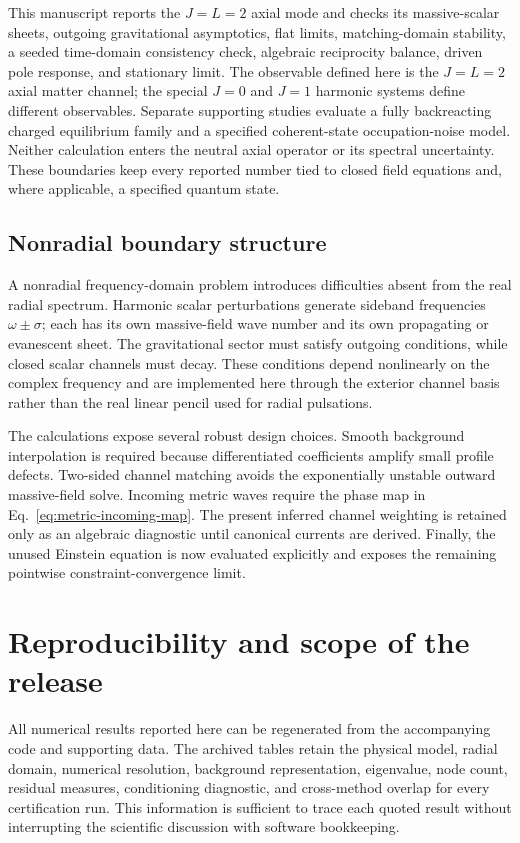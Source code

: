 \documentclass[aps,prd,preprint,onecolumn,nofootinbib,superscriptaddress,showkeys]{revtex4-2}
\begin{document}
This manuscript reports the $J=L=2$ axial mode and checks its massive-scalar
sheets, outgoing gravitational asymptotics, flat limits, matching-domain
stability, a seeded time-domain consistency check, algebraic reciprocity balance, driven
pole response, and stationary limit.  The observable defined here is the
$J=L=2$ axial matter channel; the special $J=0$ and $J=1$ harmonic systems
define different observables. Separate supporting studies evaluate a
fully backreacting charged equilibrium family and a specified coherent-state
occupation-noise model. Neither calculation enters the neutral axial operator
or its spectral uncertainty. These boundaries keep every reported number tied
to closed field equations and, where applicable, a specified quantum state.

\subsection{Nonradial boundary structure}

A nonradial frequency-domain problem introduces difficulties absent from the real radial spectrum. Harmonic scalar perturbations generate sideband frequencies $\omega\pm\sigma$; each has its own massive-field wave number and its own propagating or evanescent sheet. The gravitational sector must satisfy outgoing conditions, while closed scalar channels must decay. These conditions depend nonlinearly on the complex frequency and are implemented here through the exterior channel basis rather than the real linear pencil used for radial pulsations.

The calculations expose several robust design choices. Smooth background interpolation is required because differentiated coefficients amplify small profile defects. Two-sided channel matching avoids the exponentially unstable outward massive-field solve. Incoming metric waves require the phase map in Eq.~\eqref{eq:metric-incoming-map}. The present inferred channel weighting is retained only as an algebraic diagnostic until canonical currents are derived. Finally, the unused Einstein equation is now evaluated explicitly and exposes the remaining pointwise constraint-convergence limit.

\section{Reproducibility and scope of the release}\label{sec:repro}

All numerical results reported here can be regenerated from the accompanying code and supporting data. The archived tables retain the physical model, radial domain, numerical resolution, background representation, eigenvalue, node count, residual measures, conditioning diagnostic, and cross-method overlap for every certification run. This information is sufficient to trace each quoted result without interrupting the scientific discussion with software bookkeeping.
\end{document}
